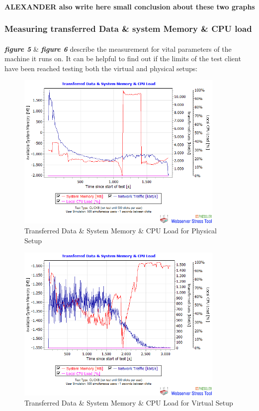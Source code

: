 \paragraph{}
\textbf{ALEXANDER also write here small conclusion about these two graphs}


\subsubsection{Measuring transferred Data \& system Memory \& CPU load}
\paragraph{}

\textbf{\textit{figure 5}} \& \textbf{\textit{figure 6}} describe the measurement for vital parameters of the machine it runs on. It can be helpful to find out if the limits of the test client have been reached testing both the virtual and physical setups:
 

 \begin{figure}[H]
    \centering
    \includegraphics[width=10cm]{Pictures/ph1.png}
    \caption{Transferred Data \& System Memory \& CPU Load for Physical Setup}
    \label{fig:QQ3}
\end{figure}
   
 
\begin{figure}[H]
    \centering
    \includegraphics[width=10cm]{Pictures/vm1.png}
    \caption{Transferred Data \& System Memory \& CPU Load for Virtual Setup}
    \label{fig:QQ3}
\end{figure} 


